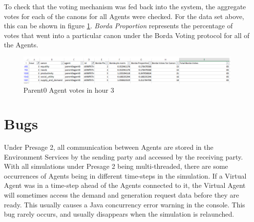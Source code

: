 To check that the voting mechanism was fed back into the system, the aggregate votes for each of the canons for all Agents were checked. For the data set above, this can be shown in figure \ref{fig:AgentVotes}. \textit{Borda Proportion} represents the percentage of votes that went into a particular canon under the Borda Voting protocol for all of the Agents.

\begin{figure}[h!]
	\centering
	\includegraphics[scale=0.34]{Images/test-allocation4.png}
	\caption{Parent0 Agent votes in hour 3}
	\label{fig:AgentVotes}
\end{figure}

\section*{Bugs}
Under Presage 2, all communication between Agents are stored in the Environment Services by the sending party and accessed by the receiving party. With all simulations under Presage 2 being multi-threaded, there are some occurrences of Agents being in different time-steps in the simulation. If a Virtual Agent was in a time-step ahead of the Agents connected to it, the Virtual Agent will sometimes access the demand and generation request data before they are ready. This usually causes a Java concurrency error warning in the console. This bug rarely occurs, and usually disappears when the simulation is relaunched.

